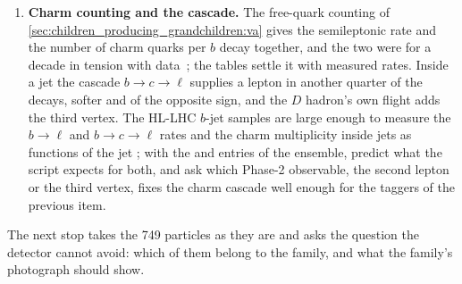 \begin{enumerate}
    the neutrino carries information about it: the V$-$A matrix element
    correlates the two momenta, and the charm cascade adds a second,
    softer lepton a quarter of the time. Soft-muon tagging is as old as
    $b$ tagging~\cite{CMS:2012feb}, and the muon-in-jet correction of
    \cite{CMS:2018nsn} is its simplest use. From the ensemble, measure
    the correlation between the lepton's \pt and $f_\nu$ and the
    resolution on the neutrino's \pt that the lepton alone gives; the
    Phase-2 question is whether an event-by-event estimate of the
    neutrino from the lepton, the vertex and the jet, fitted to the
    lepton spectra of \cite{BaBar:2004bij,Belle-II:2018jsg}, can replace
    the average correction for the semileptonic fifth of all $b$ jets.
  \item \textbf{Charm counting and the cascade.} The free-quark counting
    of \cref{sec:children_producing_grandchildren:va} gives the
    semileptonic rate and the number of charm quarks per $b$ decay
    together, and the two were for a decade in tension with
    data~\cite{Neubert:1996we,Lenz:2014jha}; the tables settle it with
    measured rates. Inside a jet the cascade $b\to c\to\ell$ supplies a
    lepton in another quarter of the decays, softer and of the opposite
    sign, and the $D$ hadron's own flight adds the third vertex. The
    HL-LHC $b$-jet samples are large enough to measure the $b\to\ell$ and
    $b\to c\to\ell$ rates and the charm multiplicity inside jets as
    functions of the jet \pt; with the  and
     entries of the ensemble, predict what the script
    expects for both, and ask which Phase-2 observable, the second
    lepton or the third vertex, fixes the charm cascade well enough for
    the taggers of the previous item.
\end{enumerate}
The next stop takes the 749 particles as they are and asks the question
the detector cannot avoid: which of them belong to the family, and what
the family's photograph should show.
